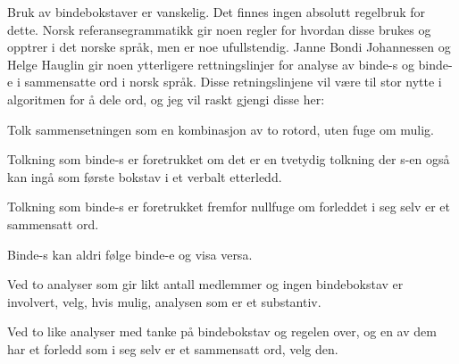 Bruk av bindebokstaver er vanskelig. Det finnes ingen absolutt regelbruk for dette. Norsk referansegrammatikk \cite{faarlund1997norsk} gir noen regler for hvordan disse brukes og opptrer i det norske språk, men er noe ufullstendig. Janne Bondi Johannessen og Helge Hauglin gir noen ytterligere rettningslinjer for analyse av binde-s og binde-e i sammensatte ord i norsk språk. Disse retningslinjene vil være til stor nytte i algoritmen for å dele ord, og jeg vil raskt gjengi disse her\cite{johannessen1996automatic}:

\begin{enum}
	\item Tolk sammensetningen som en kombinasjon av to rotord, uten fuge om mulig.
	
		\newline
	
	\item Tolkning som binde-s er foretrukket om det er en tvetydig tolkning der s-en også kan ingå som første bokstav i et verbalt etterledd.
	
		\newline
	
	\item Tolkning som binde-s er foretrukket fremfor nullfuge om forleddet i seg selv er et sammensatt ord.
	
		\newline
	
	\item Binde-s kan aldri følge binde-e og visa versa.
		
		\newline
	
	\item Ved to analyser som gir likt antall medlemmer og ingen bindebokstav er involvert, velg, hvis mulig, analysen som er et substantiv.
		
		\newline
	
	\item Ved to like analyser med tanke på bindebokstav og regelen over, og en av dem har et forledd som i seg selv er et sammensatt ord, velg den.
		
		\newline
	

\end{enum}
